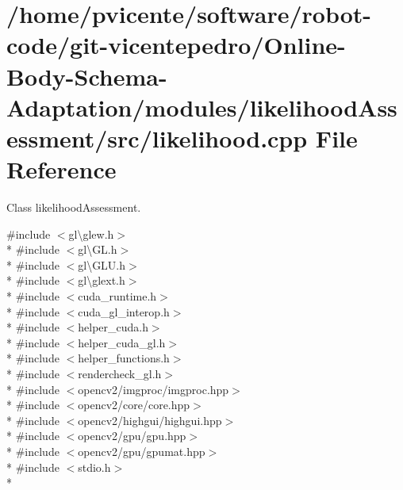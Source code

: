 \section{/home/pvicente/software/robot-\/code/git-\/vicentepedro/\+Online-\/\+Body-\/\+Schema-\/\+Adaptation/modules/likelihood\+Assessment/src/likelihood.cpp File Reference}
\label{likelihood_8cpp}


Class likelihood\+Assessment.  


{\ttfamily \#include $<$gl\textbackslash{}glew.\+h$>$}\\*
{\ttfamily \#include $<$gl\textbackslash{}\+G\+L.\+h$>$}\\*
{\ttfamily \#include $<$gl\textbackslash{}\+G\+L\+U.\+h$>$}\\*
{\ttfamily \#include $<$gl\textbackslash{}glext.\+h$>$}\\*
{\ttfamily \#include $<$cuda\+\_\+runtime.\+h$>$}\\*
{\ttfamily \#include $<$cuda\+\_\+gl\+\_\+interop.\+h$>$}\\*
{\ttfamily \#include $<$helper\+\_\+cuda.\+h$>$}\\*
{\ttfamily \#include $<$helper\+\_\+cuda\+\_\+gl.\+h$>$}\\*
{\ttfamily \#include $<$helper\+\_\+functions.\+h$>$}\\*
{\ttfamily \#include $<$rendercheck\+\_\+gl.\+h$>$}\\*
{\ttfamily \#include $<$opencv2/imgproc/imgproc.\+hpp$>$}\\*
{\ttfamily \#include $<$opencv2/core/core.\+hpp$>$}\\*
{\ttfamily \#include $<$opencv2/highgui/highgui.\+hpp$>$}\\*
{\ttfamily \#include $<$opencv2/gpu/gpu.\+hpp$>$}\\*
{\ttfamily \#include $<$opencv2/gpu/gpumat.\+hpp$>$}\\*
{\ttfamily \#include $<$stdio.\+h$>$}\\*
